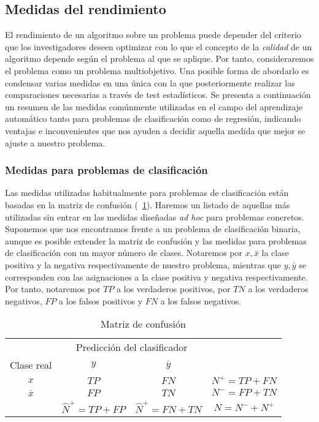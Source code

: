 	

\subsection{Medidas del rendimiento}
	
	El rendimiento de un algoritmo sobre un problema puede 
depender del criterio que los investigadores deseen optimizar 
con lo que el concepto de la \textit{calidad} de un algoritmo 
depende según el problema al que se aplique. Por tanto, 
consideraremos el problema como un problema multiobjetivo. 
Una posible forma de abordarlo es condensar varias medidas en 
una única con la que posteriormente realizar las 
comparaciones necesarias a través de test estadísticos. Se 
presenta a continuación un resumen de las medidas comúnmente 
utilizadas en el campo del aprendizaje automático tanto para 
problemas de clasificación como de regresión, indicando 
ventajas e inconvenientes que nos ayuden a decidir aquella 
medida que mejor se ajuste a nuestro problema.
	
\subsubsection*{Medidas para problemas de clasificación}

	Las medidas utilizadas habitualmente para problemas de 
clasificación están basadas en la matriz de confusión 
(~\ref{tab:matrizconfusion}). Haremos un listado de aquellas 
más utilizadas sin entrar en las medidas diseñadas \textit{ad 
hoc} para problemas concretos. Suponemos que nos encontramos 
frente a un problema de clasificación binaria, aunque es 
posible extender la matriz de confusión y las medidas para 
problemas de clasificación con un mayor número de clases.
Notaremos por $x, \bar{x}$ la clase positiva y la negativa
respectivamente de nuestro problema, mientras que $y,\bar{y}$
se corresponden con las asignaciones a la clase positiva
y negativa respectivamente. Por tanto, notaremos por $TP$ a
los verdaderos positivos, por $TN$ a los verdaderos negativos,
$FP$ a los falsos positivos y $FN$ a los falsos negativos.

\begin{table}[H]
\centering
\begin{tabular}{cccc}
\cline{1-3}
\multicolumn{1}{|c|}{}           & \multicolumn{2}{c|}{Predicción del clasificador}      &                 \\ \cline{1-3}
\multicolumn{1}{|c|}{Clase real} & \multicolumn{1}{c|}{$y$}    & \multicolumn{1}{c|}{$\bar{y}$}    &                 \\ \cline{1-3}
\multicolumn{1}{|c|}{$x$}          & \multicolumn{1}{c|}{$TP$} & \multicolumn{1}{c|}{$FN$} & $N^+ = TP + FN$ \\ \cline{1-3}
\multicolumn{1}{|c|}{$\bar{x}$}          & \multicolumn{1}{c|}{$FP$} & \multicolumn{1}{c|}{$TN$} & $N^- = FP + TN$ \\ \cline{1-3}
                                & $\hat{N}^+ = TP + FP$     & $\hat{N}^+ = FN + TN$     &   $N = N^- + N^+$             
\end{tabular}
\caption{Matriz de confusión}
\label{tab:matrizconfusion}
\end{table} 

